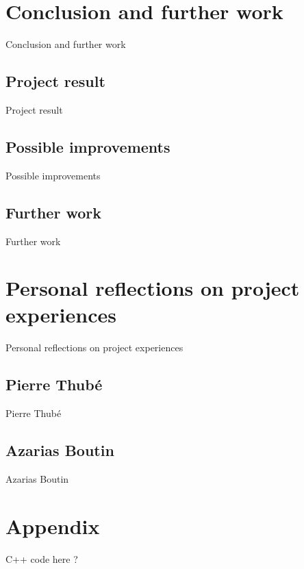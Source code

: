 \documentclass[12pt]{report}
\begin{document}
\part{Conclusion and further work}
Conclusion and further work

\chapter{Project result}
Project result

\chapter{Possible improvements}
Possible improvements

\chapter{Further work}
Further work

\part{Personal reflections on project experiences}
Personal reflections on project experiences

\chapter{Pierre Thubé}
Pierre Thubé

\chapter{Azarias Boutin}
Azarias Boutin


\part*{Appendix}
C++ code here ?
\end{document}
